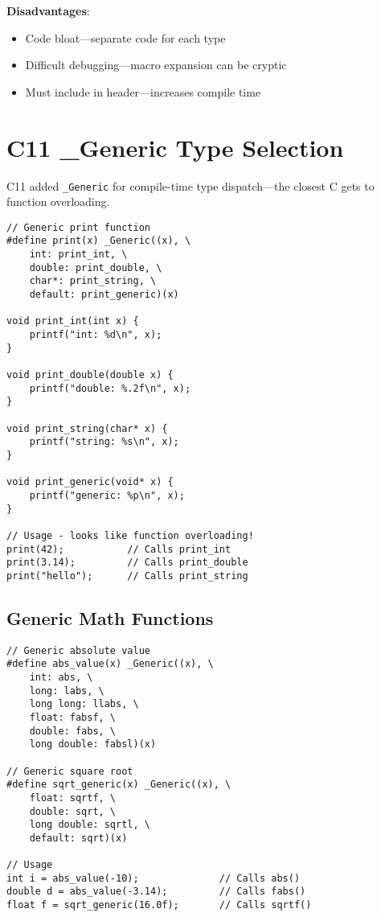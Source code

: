 \textbf{Disadvantages}:
\begin{itemize}
    \item Code bloat---separate code for each type
    \item Difficult debugging---macro expansion can be cryptic
    \item Must include in header---increases compile time
\end{itemize}

\section{C11 \_Generic Type Selection}

C11 added \texttt{\_Generic} for compile-time type dispatch---the closest C gets to function overloading.

\begin{lstlisting}
// Generic print function
#define print(x) _Generic((x), \
    int: print_int, \
    double: print_double, \
    char*: print_string, \
    default: print_generic)(x)

void print_int(int x) {
    printf("int: %d\n", x);
}

void print_double(double x) {
    printf("double: %.2f\n", x);
}

void print_string(char* x) {
    printf("string: %s\n", x);
}

void print_generic(void* x) {
    printf("generic: %p\n", x);
}

// Usage - looks like function overloading!
print(42);           // Calls print_int
print(3.14);         // Calls print_double
print("hello");      // Calls print_string
\end{lstlisting}

\subsection{Generic Math Functions}

\begin{lstlisting}
// Generic absolute value
#define abs_value(x) _Generic((x), \
    int: abs, \
    long: labs, \
    long long: llabs, \
    float: fabsf, \
    double: fabs, \
    long double: fabsl)(x)

// Generic square root
#define sqrt_generic(x) _Generic((x), \
    float: sqrtf, \
    double: sqrt, \
    long double: sqrtl, \
    default: sqrt)(x)

// Usage
int i = abs_value(-10);              // Calls abs()
double d = abs_value(-3.14);         // Calls fabs()
float f = sqrt_generic(16.0f);       // Calls sqrtf()
\end{lstlisting}

